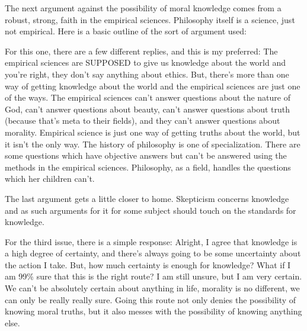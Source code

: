 The next argument against the possibility of moral knowledge comes from a robust, strong, faith in the empirical sciences. Philosophy itself is a science, just not empirical. Here is a basic outline of the sort of argument used:

For this one, there are a few different replies, and this is my preferred: The empirical sciences are SUPPOSED to give us knowledge about the world and you’re right, they don’t say anything about ethics. But, there’s more than one way of getting knowledge about the world and the empirical sciences are just one of the ways. The empirical sciences can't answer questions about the nature of God, can't answer questions about beauty, can't answer questions about truth (because that's meta to their fields), and they can't answer questions about morality. Empirical science is just one way of getting truths about the world, but it isn't the only way. The history of philosophy is one of specialization. There are some questions which have objective answers but can't be answered using the methods in the empirical sciences. Philosophy, as a field, handles the questions which her children can't.

The last argument gets a little closer to home. Skepticism concerns knowledge and as such arguments for it for some subject should touch on the standards for knowledge. 


For the third issue, there is a simple response: Alright, I agree that knowledge is a high degree of certainty, and there’s always going to be some uncertainty about the action I take. But, how much certainty is enough for knowledge? What if I am 99\% sure that this is the right route? I am still unsure, but I am very certain. We can't be absolutely certain about anything in life, morality is no different, we can only be really really sure. Going this route not only denies the possibility of knowing moral truths, but it also messes with the possibility of knowing anything else.
